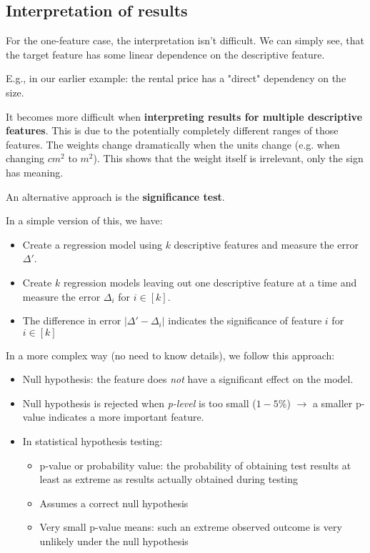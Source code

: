 \subsection{Interpretation of results}

For the one-feature case, the interpretation isn't difficult. We can simply see, that the target feature has some linear dependence on the descriptive feature. \begin{note} E.g., in our earlier example: the rental price has a "direct" dependency on the size.\end{note}

It becomes more difficult when \textbf{interpreting results for multiple descriptive features}. This is due to the potentially completely different ranges of those features. The weights change dramatically when the units change (e.g. when changing $cm^2$ to $m^2$). This shows that the weight itself is irrelevant, only the sign has meaning.

An alternative approach is the \textbf{significance test}.

In a simple version of this, we have:
\begin{itemize}
  \item Create a regression model using $k$ descriptive features and measure the error $\Delta'$.
  \item Create $k$ regression models leaving out one descriptive feature at a time and measure the error $\Delta_i$ for $i\in[k]$.
  \item The difference in error $|\Delta' - \Delta_i|$ indicates the significance of feature $i$ for $i\in[k]$
\end{itemize}

In a more complex way (no need to know details), we follow this approach:
\begin{itemize}
  \item Null hypothesis: the feature does \textit{not} have a significant effect on the model.
  \item Null hypothesis is rejected when \textit{p-level} is too small ($1-5\%$) $\rightarrow$ a smaller p-value indicates a more important feature.
  \item In statistical hypothesis testing:
  \begin{itemize}
    \item p-value or probability value: the probability of obtaining test results at least as extreme as results actually obtained during testing
    \item Assumes a correct null hypothesis
    \item Very small p-value means: such an extreme observed outcome is very unlikely under the null hypothesis
  \end{itemize}
\end{itemize}
